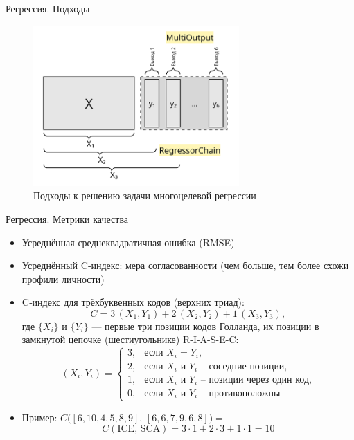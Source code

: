 \documentclass[english,russian, 10pt]{beamer}
\begin{document}
\begin{frame}{Регрессия. Подходы}
    \begin{figure}[h]
        \centering
        \includegraphics[width=0.7\textwidth]{images/regr.png}
        \caption{Подходы к решению задачи многоцелевой регрессии}
        \label{fig:MO_regr}
    \end{figure}
\end{frame}


\begin{frame}{Регрессия. Метрики качества}
  \begin{itemize}
    \item Усреднённая среднеквадратичная ошибка (RMSE)
    \item Усреднённый C‑индекс: мера согласованности (чем больше, тем более схожи профили личности)

  \vspace{0.3em}
  \item C‑индекс для трёхбуквенных кодов (верхних триад):
  \[
    C = 3\, (X_1, Y_1) + 2\, (X_2, Y_2) + 1\, (X_3, Y_3),
  \]
  где $\{X_i\}$ и $\{Y_i\}$ — первые три позиции кодов Голланда, их позиции в замкнутой цепочке (шестиугольнике) R-I-A-S-E-C:
  \[
    (X_i, Y_i) =
    \begin{cases}
      3, & \text{если $X_i = Y_i$,}\\
      2, & \text{если $X_i$ и $Y_i$ -- соседние позиции,}\\
      1, & \text{если $X_i$ и $Y_i$ -- позиции через один код,}\\
      0, & \text{если $X_i$ и $Y_i$ -- противоположны}
    \end{cases}
  \]

  \item Пример: 
    \(\displaystyle 
      C\bigl([6,10,4,5,8,9],\,[6,6,7,9,6,8]\bigr)
      =\)
    \[
      C(\mathrm{ICE},\,\mathrm{SCA})
      =3\cdot1 + 2\cdot3 + 1\cdot1
      =10
    \]
    \end{itemize}
\end{frame}
\end{document}

